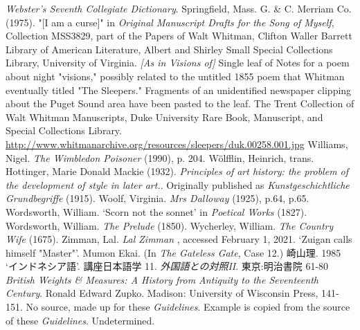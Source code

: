\begin{bibitemlist}{1}
 \textit{Webster's Seventh Collegiate Dictionary}. Springfield, Mass.  G. \& C. Merriam Co. (1975).
 "[I am a curse]" in \textit{Original Manuscript Drafts for the Song of Myself}, Collection MSS3829, part of the Papers of Walt Whitman, Clifton Waller Barrett Library of American Literature, Albert and Shirley Small Special Collections Library, University of Virginia.
 \textit{[As in Visions of]} Single leaf of Notes for a poem about night "visions," possibly related to the untitled 1855 poem that Whitman eventually titled "The Sleepers." Fragments of an unidentified newspaper clipping about the Puget Sound area have been pasted to the leaf. The Trent Collection of Walt Whitman Manuscripts, Duke University Rare Book, Manuscript, and Special Collections Library. \url{http://www.whitmanarchive.org/resources/sleepers/duk.00258.001.jpg}
 Williams, Nigel. \textit{The Wimbledon Poisoner} (1990), p. 204.
 Wölfflin, Heinrich, trans. Hottinger, Marie Donald Mackie (1932). \textit{Principles of art history: the problem of the development of style in later art.}. Originally published as \textit{Kunstgeschichtliche Grundbegriffe} (1915).
 Woolf, Virginia. \textit{Mrs Dalloway} (1925), p.64, p.65.
 Wordsworth, William. ‘Scorn not the sonnet’ in \textit{Poetical Works} (1827).
 Wordsworth, William. \textit{The Prelude} (1850).
 Wycherley, William. \textit{The Country Wife} (1675).
 Zimman, Lal. \textit{Lal Zimman} , accessed February 1, 2021.
 ‘Zuigan calls himself "Master"’. Mumon Ekai. (In \textit{The Gateless Gate}, Case 12.)
 崎山理. 1985 ‘インドネシア語’. 講座日本語学 11. \textit{外国語との対照II}. 東京:明治書院 61-80
 \textit{British Weights \& Measures: A History from Antiquity to the Seventeenth Century}. Ronald Edward Zupko. Madison: University of Wisconsin Press, 141-151.
 No source, made up for these \textit{Guidelines}.
 Example is copied from the source of these \textit{Guidelines}.
 Undetermined.

\end{bibitemlist}
